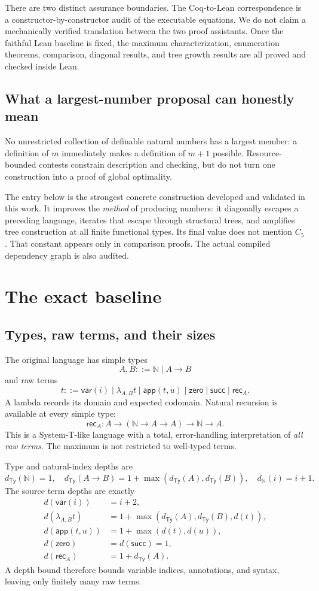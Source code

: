 \documentclass[11pt,letterpaper]{article}
\theoremstyle{definition}
\newcommand{\N}{\mathbb N}
\newcommand{\Ty}{\mathsf{Ty}}
\begin{document}
There are two distinct assurance boundaries. The Coq-to-Lean correspondence
is a constructor-by-constructor audit of the executable equations. We do not
claim a mechanically verified translation between the two proof assistants.
Once the faithful Lean baseline is fixed, the maximum characterization,
enumeration theorems, comparison, diagonal results, and tree growth results
are all proved and checked inside Lean.

\subsection{What a largest-number proposal can honestly mean}
No unrestricted collection of definable natural numbers has a largest member:
a definition of \(m\) immediately makes a definition of \(m+1\) possible.
Resource-bounded contests constrain description and checking, but do not
turn one construction into a proof of global optimality.

The entry below is the strongest concrete construction developed and
validated in this work. It improves the \emph{method} of producing numbers:
it diagonally escapes a preceding language, iterates that escape through
structural trees, and amplifies tree construction at all finite functional
types. Its final value does not mention \(C_5\). That constant appears only
in comparison proofs. The actual compiled dependency graph is also audited.

\section{The exact baseline}\label{sec:baseline}
\subsection{Types, raw terms, and their sizes}
The original language has simple types
\[
             A,B ::= \N \mid A\to B
\]
and raw terms
\[
 t ::= \mathsf{var}(i)\mid\lambda_{A,B}t\mid\mathsf{app}(t,u)
       \mid\mathsf{zero}\mid\mathsf{succ}\mid\mathsf{rec}_A.
\]
A lambda records its domain and expected codomain. Natural recursion is
available at every simple type:
\[
 \mathsf{rec}_A:A\to(\N\to A\to A)\to\N\to A.
\]
This is a System-T-like language with a total, error-handling interpretation
of \emph{all raw terms}. The maximum is not restricted to well-typed terms.

Type and natural-index depths are
\[
 d_{\Ty}(\N)=1,\quad
 d_{\Ty}(A\to B)=1+\max(d_{\Ty}(A),d_{\Ty}(B)),\quad d_{\N}(i)=i+1.
\]
The source term depths are exactly
\begin{align*}
 d(\mathsf{var}(i))&=i+2,\\
 d(\lambda_{A,B}t)&=1+\max(d_{\Ty}(A),d_{\Ty}(B),d(t)),\\
 d(\mathsf{app}(t,u))&=1+\max(d(t),d(u)),\\
 d(\mathsf{zero})&=d(\mathsf{succ})=1,\\
 d(\mathsf{rec}_A)&=1+d_{\Ty}(A).
\end{align*}
A depth bound therefore bounds variable indices, annotations, and syntax,
leaving only finitely many raw terms.
\end{document}
